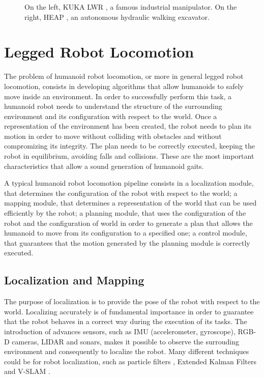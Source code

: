 \begin{figure}
\begin{subfigure}[b]{0.6\textwidth}
    \caption{}
    \label{fig:ethz-heap-excavator}
  \end{subfigure}
  \caption{On the left, KUKA LWR \cite{Gaz2014KUKALWR}, a famous industrial
      manipulator. On the right, HEAP \cite{Hutter2015WalkingExcavators},
      an autonomous hydraulic walking excavator.}
\end{figure}


\section{Legged Robot Locomotion}
The problem of humanoid robot locomotion, or more in general legged robot 
locomotion, consists in developing algorithms that allow humanoids to 
safely move inside an environment. In order to successfully perform this task,
a humanoid robot needs to understand the structure of the
surrounding environment and its configuration with respect to the world.
Once a representation of the 
environment has been created, the robot needs to plan its motion in order to
move without colliding with obstacles and without compromizing its integrity.
The plan needs to be correctly executed, keeping the robot in equilibrium,
avoiding falls and collisions. These are the most important characteristics
that allow a sound generation of humanoid gaits.

A typical humanoid robot locomotion pipeline consists in a localization module,
that determines the configuration of the robot with respect to the world; a 
mapping module, that determines a representation of the world that can be used 
efficiently by the robot; a planning module, that uses the configuration of 
the robot and the configuration of world in order to generate a plan that 
allows the humanoid to move from its configuration to a specified one;
a control module, that guarantees that the motion generated by the planning
module is correctly executed.

\subsection{Localization and Mapping}
The purpose of localization is to provide the pose of the robot with respect
to the world. Localizing accurately is of fundamental importance in order to
guarantee that the robot behaves in a correct way during the execution of its
tasks. The introduction of advances sensors, such as IMU (accelerometer,
gyroscope), RGB-D cameras, LIDAR and sonars, makes it possible to observe
the surrouding environment and consequently to localize the robot. Many
different techniques could be for robot localization, such as
particle filters \cite{Hornung2010HumanoidRobotLocalization}, Extended
Kalman Filters \cite{Oriolo2015HumanoidOdometricLocalization} and V-SLAM
\cite{Tanguy2019MPCWithDenseVisualSLAM}.

